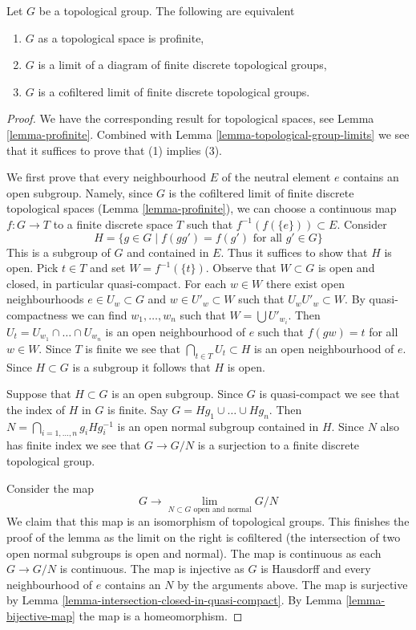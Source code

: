 \begin{lemma}
\label{lemma-profinite-group}
Let $G$ be a topological group. The following are equivalent
\begin{enumerate}
\item $G$ as a topological space is profinite,
\item $G$ is a limit of a diagram of finite discrete topological groups,
\item $G$ is a cofiltered limit of finite discrete topological groups.
\end{enumerate}
\end{lemma}

\begin{proof}
We have the corresponding result for topological spaces, see
Lemma \ref{lemma-profinite}. Combined with
Lemma \ref{lemma-topological-group-limits}
we see that it suffices to prove that (1) implies (3).

\medskip\noindent
We first prove that every neighbourhood $E$ of the neutral element $e$ contains
an open subgroup. Namely, since $G$ is the cofiltered limit of finite
discrete topological spaces (Lemma \ref{lemma-profinite}),
we can choose a continuous map $f : G \to T$ to a finite discrete
space $T$ such that $f^{-1}(f(\{e\})) \subset E$.
Consider
$$
H = \{g \in G \mid f(gg') = f(g')\text{ for all }g' \in G\}
$$
This is a subgroup of $G$ and contained in $E$. Thus it suffices to
show that $H$ is open. Pick $t \in T$ and set $W = f^{-1}(\{t\})$.
Observe that $W \subset G$ is open and closed, in particular quasi-compact.
For each $w \in W$ there exist open neighbourhoods $e \in U_w \subset G$
and $w \in U'_w \subset W$ such that $U_wU'_w \subset W$.
By quasi-compactness we can find $w_1, \ldots, w_n$ such that
$W = \bigcup U'_{w_i}$. Then
$U_t = U_{w_1} \cap \ldots \cap U_{w_n}$ is an open neighbourhood
of $e$ such that $f(gw) = t$ for all $w \in W$.
Since $T$ is finite we see that $\bigcap_{t \in T} U_t \subset H$
is an open neighbourhood of $e$. Since $H \subset G$ is a subgroup
it follows that $H$ is open.

\medskip\noindent
Suppose that $H \subset G$ is an open subgroup. Since $G$ is quasi-compact
we see that the index of $H$ in $G$ is finite. Say
$G = Hg_1 \cup \ldots \cup Hg_n$. Then
$N = \bigcap_{i = 1, \ldots, n} g_iHg_i^{-1}$ is
an open normal subgroup contained in $H$. Since $N$ also has finite
index we see that $G \to G/N$ is a surjection to a finite discrete
topological group.

\medskip\noindent
Consider the map
$$
G \longrightarrow \lim_{N \subset G\text{ open and normal}} G/N
$$
We claim that this map is an isomorphism of topological groups.
This finishes the proof of the lemma as the limit on the right
is cofiltered (the intersection of two open normal subgroups is
open and normal). The map is continuous as each $G \to G/N$ is continuous.
The map is injective as $G$ is Hausdorff and every neighbourhood
of $e$ contains an $N$ by the arguments above.
The map is surjective by
Lemma \ref{lemma-intersection-closed-in-quasi-compact}.
By Lemma \ref{lemma-bijective-map} the map is a homeomorphism.
\end{proof}

